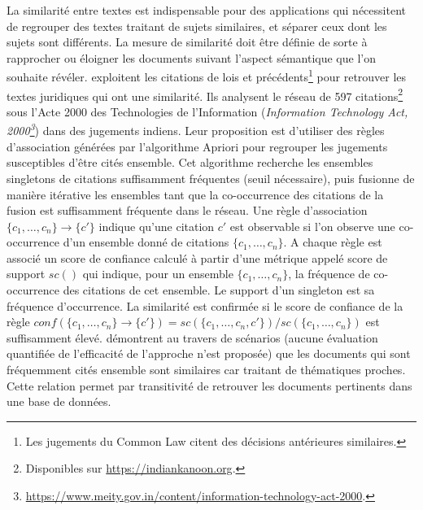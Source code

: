 La similarité entre textes est indispensable pour des applications qui nécessitent de regrouper des textes traitant de sujets similaires, et séparer ceux dont les sujets sont différents. La  mesure de similarité doit être définie de sorte à rapprocher ou éloigner les documents suivant l'aspect sémantique que l'on souhaite révéler. \citet{nair2018judgsimassorule} exploitent les citations de lois et précédents\footnote{Les jugements du \og Common Law \fg{} citent des décisions antérieures similaires.} pour retrouver les textes juridiques qui ont une similarité. Ils analysent le réseau de 597 citations\footnote{Disponibles sur \url{https://indiankanoon.org}.} sous l'Acte 2000 des Technologies de l'Information (\textit{Information Technology Act, 2000\footnote{\url{https://www.meity.gov.in/content/information-technology-act-2000}.}}) dans des jugements indiens. Leur proposition est d'utiliser des règles d'association générées par l'algorithme Apriori \citep{agrawal1994algoApriori} pour regrouper les jugements susceptibles d'être cités ensemble. Cet algorithme recherche les ensembles singletons de citations suffisamment fréquentes (seuil nécessaire), puis fusionne de manière itérative les ensembles tant que la co-occurrence des citations de la fusion est suffisamment fréquente dans le réseau. Une règle d'association $\lbrace c_1,\dots,c_n \rbrace \rightarrow \lbrace c' \rbrace$ indique qu'une citation $c'$ est observable si l'on observe une co-occurrence d'un ensemble donné de citations $\lbrace c_1,\dots,c_n \rbrace$. A chaque règle est associé un score de confiance calculé à partir d'une métrique appelé score de support $sc()$ qui indique, pour un ensemble $\lbrace c_1,\dots,c_n \rbrace$, la fréquence de co-occurrence des citations de cet ensemble. Le support d'un singleton est sa fréquence d'occurrence. La similarité est confirmée si le score de confiance de la règle  $conf(\lbrace c_1,\dots,c_n \rbrace \rightarrow \lbrace c' \rbrace) = sc(\lbrace c_1,\dots,c_n, c' \rbrace) / sc(\lbrace c_1,\dots,c_n \rbrace)$ est suffisamment élevé.
\citet{nair2018judgsimassorule} démontrent au travers de scénarios (aucune évaluation quantifiée de l'efficacité de l'approche n'est proposée) que les documents qui sont fréquemment cités ensemble sont similaires car traitant de thématiques proches. Cette relation permet par transitivité de retrouver les documents pertinents dans une base de données. 

